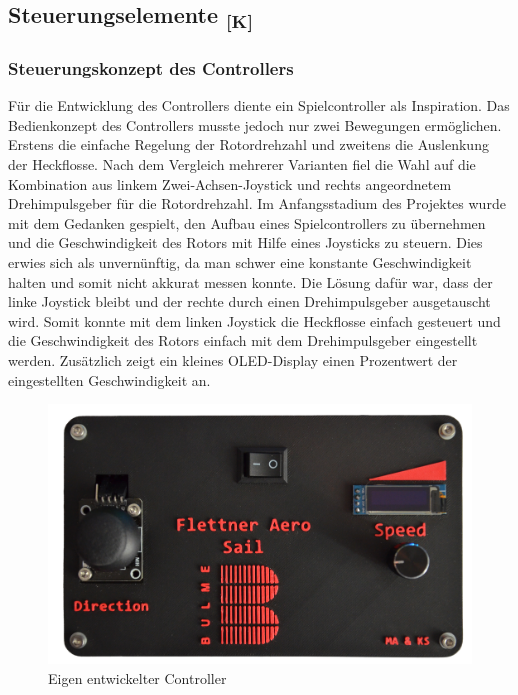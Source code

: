 \documentclass[a4paper,12pt]{article}
\begin{document}
\newpage

\subsection{\texorpdfstring{Steuerungselemente \textsubscript{[K]}}{Steuerungselemente [K]}}

\subsubsection{Steuerungskonzept des Controllers}
Für die Entwicklung des Controllers diente ein Spielcontroller als Inspiration. Das Bedienkonzept des Controllers musste jedoch nur zwei Bewegungen ermöglichen. Erstens die einfache Regelung der Rotordrehzahl und zweitens die Auslenkung der Heckflosse. Nach dem Vergleich mehrerer Varianten fiel die Wahl auf die Kombination aus linkem Zwei-Achsen-Joystick und rechts angeordnetem Drehimpulsgeber für die Rotordrehzahl. Im Anfangsstadium des Projektes wurde mit dem Gedanken gespielt, den Aufbau eines Spielcontrollers zu übernehmen und die Geschwindigkeit des Rotors mit Hilfe eines Joysticks zu steuern. Dies erwies sich als unvernünftig, da man schwer eine konstante Geschwindigkeit halten und somit nicht akkurat messen konnte. Die Lösung dafür war, dass der linke Joystick bleibt und der rechte durch einen Drehimpulsgeber ausgetauscht wird. Somit konnte mit dem linken Joystick die Heckflosse einfach gesteuert und die Geschwindigkeit des Rotors einfach mit dem Drehimpulsgeber eingestellt werden. Zusätzlich zeigt ein kleines OLED-Display einen Prozentwert der eingestellten Geschwindigkeit an.



\begin{figure}[H]
    \centering
    \includegraphics[width=0.8\linewidth]{images/Controller ohne Hintergrund.jpg}
    \caption{Eigen entwickelter Controller}
    \label{fig:ControllerBild}
\end{figure}
\end{document}
